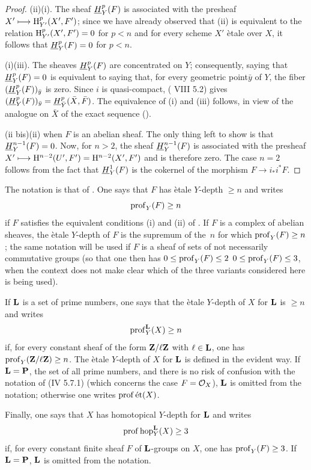 \begin{proof}
\textup{(ii)}\ALORS \textup{(i)}. The sheaf ${\h}_Y^p(F)$ is associated with the presheaf $X'\mto \H_{Y'}^p(X', F')$; since we have already observed that \textup{(ii)} is equivalent to the relation $\H_{Y'}^p(X', F')=0$ for $p<n$ and for every scheme $X'$ \`etale over $X$, it follows that ${\h}_Y^p(F)=0$ for $p<n$.

\textup{(i)}\SSI \textup{(iii)}. The sheaves ${\h}_Y^p(F)$ are concentrated on $Y$; consequently, saying that ${\h}_Y^p(F)=0$ is equivalent to saying that, for every geometric point\pageoriginale $\bar y$ of $Y$, the fiber $({\h}_Y^p(F))_{\bar y}$ is zero. Since $i$ is quasi-compact, ( VIII 5.2) gives $({\h}_Y^p(F))_{\bar y}={\h}_{\bar Y}^p(\bar X, \bar F)$. The equivalence of \textup{(i)} and \textup{(iii)} follows, in view of the analogue on $\bar X$ of the exact sequence ().

(ii bis)\ALORS \textup{(ii)} when $F$ is an abelian sheaf. The only thing left to show is that ${\h}_Y^{n-1}(F)=0$. Now, for $n>2$, the sheaf ${\h}_Y^{n-1}(F)$ is associated with the presheaf $X'\mto \H^{n-2}(U', F')=\H^{n-2}(X', F')$ and is therefore zero. The case $n=2$ follows from the fact that ${\h}_Y^1(F)$ is the cokernel of the morphism $F\to i_*i^*F$.
\skipqed
\end{proof}

\begin{definition} \label{XIV.1.2}
The notation is that of . One says that $F$ has \`etale $Y$-depth $\geq n$ and writes
$$
\prof_Y(F)\geq n$$
if $F$ satisfies the equivalent conditions \textup{(i)} and \textup{(ii)} of . If $F$ is a complex of abelian sheaves, the \`etale $Y$-depth of $F$ is the supremum of the~$n$ for which $\prof_Y(F)\geq n$; the same notation will be used if $F$ is a sheaf of sets \resp of not necessarily commutative groups (so that one then has $0\leq \prof_Y(F)\leq 2$\sisi{}{,} \resp $0\leq \prof_Y(F)\leq 3$, when the context does not make clear which of the three variants considered here is being used).

If $\LL$ is a set of prime numbers, one says that the \`etale $Y$-depth of $X$ for $\LL$ is $\geq n$ and writes
$$
\prof_Y^{\LL}(X)\geq n
$$
if, for every constant sheaf of the form $\ZZ/\ell\ZZ$ with $\ell\in \LL$, one has $\prof_Y(\ZZ/\ell\ZZ)\geq n$\pageoriginale. The \`etale $Y$-depth of $X$ for $\LL$ is defined in the evident way. If $\LL=\PP$, the set of all prime numbers, and there is no risk of confusion with the notation of \textup{(\EGA IV 5.7.1)} (which concerns the case $F=\OX$), $\LL$ is omitted from the notation; otherwise one writes $\prof \et(X)$.

Finally, one says that $X$ has homotopical $Y$-depth  for $\LL \sisi{\geq 3}{}$ and writes
$$
\prof \hop_Y^{\LL}(X)\geq 3$$
if, for every constant finite sheaf $F$ of $\LL$-groups on $X$, one has $\prof_Y(F)\geq 3$. If $\LL=\PP$, $\LL$ is omitted from the notation.
\end{definition}

